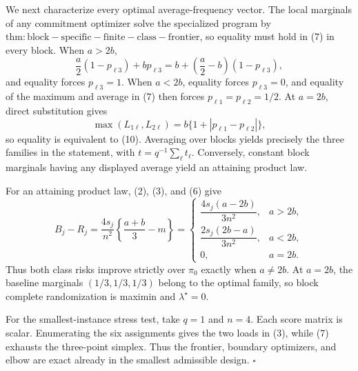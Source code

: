 We next characterize every optimal average-frequency vector.  The local marginals of any commitment optimizer solve the specialized program by \(\mathrm{thm:block-specific-finite-class-frontier}\), so equality must hold in (7) in every block.  When \(a>2b\),
\[
\frac a2(1-p_{\ell3})+bp_{\ell3}
=b+\left(\frac a2-b\right)(1-p_{\ell3}),
\]
and equality forces \(p_{\ell3}=1\).  When \(a<2b\), equality forces \(p_{\ell3}=0\), and equality of the maximum and average in (7) then forces \(p_{\ell1}=p_{\ell2}=1/2\).  At \(a=2b\), direct substitution gives
\[
\max(L_{1\ell},L_{2\ell})
=b\{1+|p_{\ell1}-p_{\ell2}|\},
\]
so equality is equivalent to (10).  Averaging over blocks yields precisely the three families in the statement, with \(t=q^{-1}\sum_\ell t_\ell\).  Conversely, constant block marginals having any displayed average yield an attaining product law.

For an attaining product law, (2), (3), and (6) give
\[
B_j-R_j
=\frac{4s_j}{n^2}\left\{\frac{a+b}{3}-m\right\}
=
\begin{cases}
\dfrac{4s_j(a-2b)}{3n^2},&a>2b,\\[6pt]
\dfrac{2s_j(2b-a)}{3n^2},&a<2b,\\[6pt]
0,&a=2b.
\end{cases}
\tag{11}
\]
Thus both class risks improve strictly over \(\pi_0\) exactly when \(a\ne2b\).  At \(a=2b\), the baseline marginals \((1/3,1/3,1/3)\) belong to the optimal family, so block complete randomization is maximin and \(\lambda^\star=0\).

For the smallest-instance stress test, take \(q=1\) and \(n=4\).  Each score matrix is scalar.  Enumerating the six assignments gives the two loads in (3), while (7) exhausts the three-point simplex.  Thus the frontier, boundary optimizers, and elbow are exact already in the smallest admissible design. \(\square\)